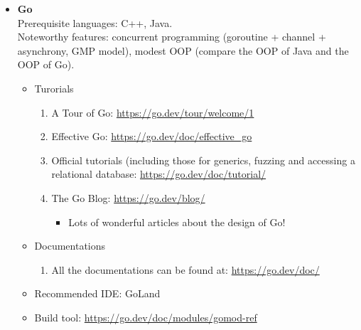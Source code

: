 \documentclass{article}
\begin{document}
\begin{itemize}
    \item \textbf{Go}\\
    Prerequisite languages: C++, Java.\\
    Noteworthy features: concurrent programming (goroutine + channel + asynchrony, GMP model), modest OOP (compare the OOP of Java and the OOP of Go).
    \begin{itemize}
        \item Turorials
        \begin{enumerate}
            \item A Tour of Go:
            \href{https://go.dev/tour/welcome/1}{https://go.dev/tour/welcome/1}
            \item Effective Go:
            \href{https://go.dev/doc/effective\_go}{https://go.dev/doc/effective\_go}
            \item Official tutorials (including those for generics, fuzzing and accessing a relational database:
            \href{https://go.dev/doc/tutorial/}{https://go.dev/doc/tutorial/}
            \item The Go Blog:
            \href{https://go.dev/blog/}{https://go.dev/blog/}
            \begin{itemize}
                \item Lots of wonderful articles about the design of Go!
            \end{itemize}        
        \end{enumerate}
        \item Documentations
        \begin{enumerate}
            \item All the documentations can be found at:
            \href{https://go.dev/doc/}{https://go.dev/doc/}
        \end{enumerate}
        \item Recommended IDE: GoLand
        \item Build tool:
        \href{https://go.dev/doc/modules/gomod-ref}{https://go.dev/doc/modules/gomod-ref}
    \end{itemize}
    

\end{itemize}
\end{document}
